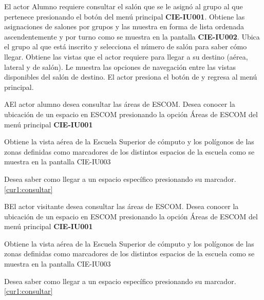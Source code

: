  \begin{UCtrayectoria}
    \UCpaso[\UCactor] El actor Alumno requiere consultar el salón que se le asignó al grupo al que pertenece presionando el botón  del menú principal \textbf{CIE-IU001}.  
    \UCpaso[\UCsist] Obtiene las asignaciones de salones por grupos y las muestra en forma de lista ordenada ascendentemente y por turno como se muestra en la pantalla \textbf{CIE-IU002}. 
    \UCpaso[\UCactor] Ubica el grupo al que está inscrito y selecciona el número de salón para saber cómo llegar.
    \UCpaso[\UCsist] Obtiene las vistas que el actor requiere para llegar a su destino (aérea, lateral y de salón). \label{cur1:consultar}
    \UCpaso[\UCsist] Le muestra las opciones de navegación entre las vistas disponibles del salón de destino.
	\UCpaso[\UCactor] El actor presiona el botón de  y regresa al menú principal.
 \end{UCtrayectoria}

 \begin{UCtrayectoriaA}{A}{El actor alumno desea consultar las áreas de ESCOM.}
    \UCpaso[\UCactor] Desea conocer la ubicación de un espacio en ESCOM presionando la opción Áreas de ESCOM del menú principal \textbf{CIE-IU001}
    
   \UCpaso[\UCsist] Obtiene la vista aérea de la Escuela Superior de cómputo y los polígonos de las zonas definidas como marcadores de los distintos espacios de la escuela como se muestra en la pantalla CIE-IU003
   
   \UCpaso[\UCactor] Desea saber como llegar a un espacio específico presionando su marcador. \ref{cur1:consultar}
 \end{UCtrayectoriaA}
 
  \begin{UCtrayectoriaA}{B}{El actor visitante desea consultar las áreas de ESCOM.}
 	\UCpaso[\UCactor] Desea conocer la ubicación de un espacio en ESCOM presionando la opción Áreas de ESCOM del menú principal \textbf{CIE-IU001}
 	
 	\UCpaso[\UCsist] Obtiene la vista aérea de la Escuela Superior de cómputo y los polígonos de las zonas definidas como marcadores de los distintos espacios de la escuela como se muestra en la pantalla CIE-IU003
 	
 	\UCpaso[\UCactor] Desea saber como llegar a un espacio específico presionando su marcador. \ref{cur1:consultar}
 \end{UCtrayectoriaA}

 
%
%
 